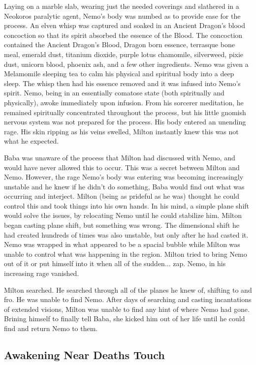 \documentclass[letterpaper,10pt,twoside,twocolumn,openany]{book}
\begin{document}
Laying on a marble slab, wearing just the needed coverings and slathered in a Neokoros paralytic agent, Nemo's body was numbed as to provide ease for the process. An elven whisp was captured and soaked in an Ancient Dragon's blood concoction so that its spirit absorbed the essence of the Blood. The concoction contained the Ancient Dragon's Blood, Dragon born essence, terrasque bone meal, emerald dust, titanium dioxide, purple lotus chamomile, silverweed, pixie dust, unicorn blood, phoenix ash, and a few other ingredients. Nemo was given a Melamomile sleeping tea to calm his physical and spiritual body into a deep sleep. The whisp then had his essence removed and it was infused into Nemo's spirit. Nemo, being in an essentially comatose state (both spiritually and physically), awoke immediately upon infusion. From his sorcerer meditation, he remained spiritually concentrated throughout the process, but his little gnomish nervous system was not prepared for the process. His body entered an unending rage. His skin ripping as his veins swelled, Milton instantly knew this was not what he expected.  

Baba was unaware of the process that Milton had discussed with Nemo, and would have never allowed this to occur. This was a secret between Milton and Nemo. However, the rage Nemo's body was entering was becoming increasingly unstable and he knew if he didn't do something, Baba would find out what was occurring and interject. Milton (being as prideful as he was) thought he could control this and took things into his own hands. In his mind, a simple plane shift would solve the issues, by relocating Nemo until he could stabilize him. Milton began casting plane shift, but something was wrong. The dimensional shift he had created hundreds of times was also unstable, but only after he had casted it. Nemo was wrapped in what appeared to be a spacial bubble while Milton was unable to control what was happening in the region. Milton tried to bring Nemo out of it or put himself into it when all of the sudden... zap. Nemo, in his increasing rage vanished. 

Milton searched. He searched through all of the planes he knew of, shifting to and fro. He was unable to find Nemo. After days of searching and casting incantations of extended visions, Milton was unable to find any hint of where Nemo had gone. Brining himself to finally tell Baba, she kicked him out of her life until he could find and return Nemo to them.

\subsection{Awakening Near Deaths Touch}
\end{document}
